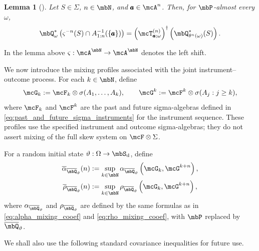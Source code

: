 \documentclass[a4paper]{article}
\numberwithin{equation}{section}   %
\theoremstyle{plain}   %
\theoremstyle{plain}   %
\newtheorem{lemma}{Lemma}[section]   %
\theoremstyle{examplestyle}
\DeclareMathOperator{\states}{\mbS_d}   %
\DeclareMathOperator{\pr}{\mbP}           %
\newcommand{\adj}{^\dagger}         %
\begin{document}
    \begin{lemma}[{\cite[Lemma~3.1]{qtlln}}]
    \label{lem:disordered_k_m_lemma_1_2}
        Let \(S\in\Sigma\), \(n\in\mbN\), and
        \(\pmb a\in\mcA^n\). Then, for \(\pr\)-almost every
        \(\omega\),
        \[
            \mbQ^*_\omega
            \left(
                \varsigma^{-n}(S)
                \cap
                A_{1:n}^{-1}(\{\pmb a\})
            \right)
            =
            \left(\mcT^{(n)}_{\pmb a;\omega}\right)\adj
            \left(
                \mbQ^*_{\theta^n(\omega)}(S)
            \right).
        \]
    \end{lemma}

    In the lemma above \(\varsigma:\mcA^{\mbN}\to\mcA^{\mbN}\) denotes the left shift. 

    We now introduce the mixing profiles associated with the joint instrument--outcome process. 
    For each \(k\in\mbN\), define
    \begin{equation}
        \label{eq:mixing+joint}
        \mcG_k
        :=
        \mcF_k\otimes\sigma(A_1,\ldots,A_k),
        \qquad
        \mcG^k
        :=
        \mcF^k\otimes\sigma(A_j:j\geq k),
    \end{equation}
    where $\mcF_k$ and $\mcF^k$ are the past and future sigma-algebras defined in \cref{eq:past_and_future_sigma_instruments} for the instrument sequence. These profiles use the specified instrument and outcome sigma-algebras; they do not assert mixing of the full skew system on $\mcF\otimes\Sigma$. 

    For a random initial state \(\vartheta:\Omega\to\states\), define
    \begin{align}
        \overline{\alpha}_{\overline{\mbQ}_{\vartheta}}(n)
        &:=
        \sup_{k\in\mbN}
        \alpha_{\overline{\mbQ}_{\vartheta}}
        \left(\mcG_k,\mcG^{k+n}\right),
        \label{eq:alpha_n_skew}
        \\
        \overline{\rho}_{\overline{\mbQ}_{\vartheta}}(n)
        &:=
        \sup_{k\in\mbN}
        \rho_{\overline{\mbQ}_{\vartheta}}
        \left(\mcG_k,\mcG^{k+n}\right),
        \label{eq:rho_n_skew}
    \end{align}
   where \(\alpha_{\overline{\mbQ}_{\vartheta}}\) and \(\rho_{\overline{\mbQ}_{\vartheta}}\) are defined by the same formulas as in \eqref{eq:alpha_mixing_cooef} and \eqref{eq:rho_mixing_cooef}, with \(\pr\) replaced by \(\overline{\mbQ}_{\vartheta}\).

    \smallskip

    We shall also use the following standard covariance inequalities for future use. 
\end{document}
